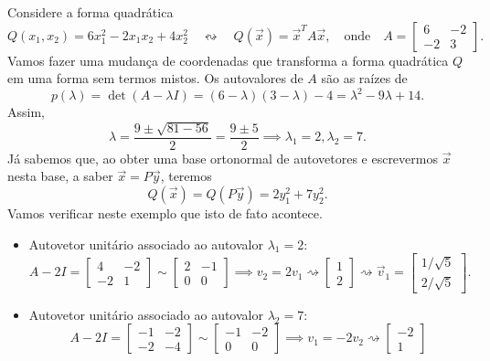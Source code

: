 \documentclass[../livro.tex]{subfiles}
\begin{document}
\begin{example}
	Considere a forma quadrática
	\[
	Q(x_1, x_2) = 6x_1^2 - 2 x_1x_2 + 4 x_2^2 \quad \leftrightsquigarrow \quad Q(\vec{x}) = \vec{x}^T A \vec{x}, \quad \text{onde} \quad
	A = 
	\begin{bmatrix}
	6 & -2 \\
	-2 &  3
	\end{bmatrix}.
	\] Vamos fazer uma mudança de coordenadas que transforma a forma quadrática $Q$ em uma forma sem termos mistos. Os autovalores de $A$ são as raízes de
	\[
	p(\lambda) = \det (A- \lambda I) = (6 - \lambda)(3 - \lambda) - 4 = \lambda^2 - 9 \lambda + 14.
	\] Assim,
	\[
	\lambda = \frac{9 \pm \sqrt{81 - 56}}{2} = \frac{9 \pm 5}{2} \implies \lambda_1 = 2, \lambda_2 = 7.
	\] Já sabemos que, ao obter uma base ortonormal de autovetores e escrevermos $\vec{x}$ nesta base, a saber $\vec{x} = P\vec{y}$, teremos
	\[
	Q(\vec{x}) = Q (P\vec{y}) = 2 y_1^2 + 7 y_2^2.
	\] Vamos verificar neste exemplo que isto de fato acontece.
	\begin{itemize}
		\item Autovetor unitário associado ao autovalor $\lambda_1 = 2$:
		\[
		A -2I = 
		\begin{bmatrix}
		4 & -2 \\
		-2 &  1
		\end{bmatrix} \sim 
		\begin{bmatrix}
		2 & -1 \\
		0 &  0
		\end{bmatrix} \implies v_2 = 2v_1 \rightsquigarrow 
		\begin{bmatrix}
		1 \\ 2
		\end{bmatrix} \rightsquigarrow
		\vec{v}_1 = \begin{bmatrix}
		1/\sqrt{5} \\ 2/\sqrt{5}
		\end{bmatrix} .
		\]
		\item Autovetor unitário associado ao autovalor $\lambda_2 = 7$:
		\[
		A -2I = 
		\begin{bmatrix}
		-1 & -2 \\
		-2 &  -4
		\end{bmatrix} \sim 
		\begin{bmatrix}
		-1 & -2 \\
		0 &  0
		\end{bmatrix} \implies v_1 = -2v_2 \rightsquigarrow 
		\begin{bmatrix}
		-2 \\ 1

\end{bmatrix}\]
\end{itemize}
\end{example}
\end{document}
